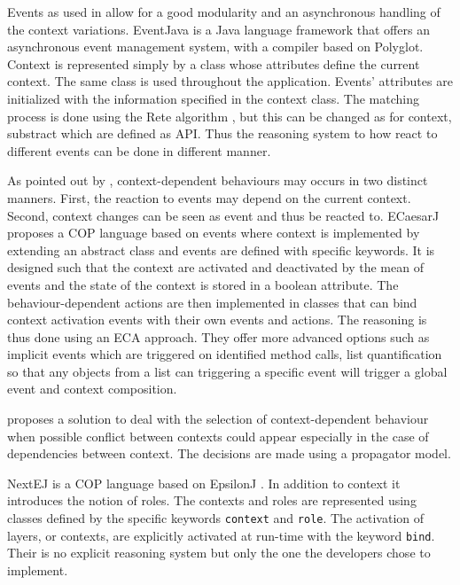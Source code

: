 \documentclass[a4paper]{article}
\begin{document}
Events as used in \cite{kamina_eventcj:_2011} allow for a good modularity and an asynchronous handling of the context variations. EventJava \cite{jayaram_context-oriented_2009} is a Java language framework that offers an asynchronous event management system, with a compiler based on Polyglot. Context is represented simply by a class whose attributes define the current context. The same class is used throughout the application. Events' attributes are initialized with the information specified in the context class. The matching process is done using the Rete algorithm \cite{}, but this can be changed as for context, substract which are defined as API. Thus the reasoning system to how react to different events can be done in different manner.

As pointed out by \cite{nunez_declarative_2009}, context-dependent behaviours may occurs in two distinct manners. First, the reaction to events may depend on the current context. Second, context changes can be seen as event and thus be reacted to. ECaesarJ \cite{nunez_declarative_2009} proposes a COP language based on events where context is implemented by extending an abstract class and events are defined with specific keywords. It is designed such that the context are activated and deactivated by the mean of events and the state of the context is stored in a boolean attribute. The behaviour-dependent actions are then implemented in classes that can bind context activation events with their own events and actions. The reasoning is thus done using an ECA approach. They offer more advanced options such as implicit events which are triggered on identified method calls, list quantification so that any objects from a list can triggering a specific event will trigger a global event and context composition.

\cite{bainomugisha_towards_2009} proposes a solution to deal with the selection of context-dependent behaviour when possible conflict between contexts could appear especially in the case of dependencies between context.  The decisions are made using a propagator model.

NextEJ \cite{kamina_towards_2009} is a COP language based on EpsilonJ \cite{}. In addition to context it introduces the notion of roles. The contexts and roles are represented using classes defined by the specific keywords \lstinline|context| and \lstinline|role|. The activation of layers, or contexts, are explicitly activated at run-time with the keyword \lstinline|bind|. Their is no explicit reasoning system but only the one the developers chose to implement.
\end{document}
